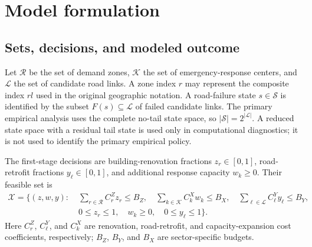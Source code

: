 ﻿%
%

\section{Model formulation}
\label{sec:model}

\subsection{Sets, decisions, and modeled outcome}
\label{sec:notation}

Let \(\mathcal R\) be the set of demand zones, \(\mathcal K\) the set of
emergency-response centers, and \(\mathcal L\) the set of candidate road
links. A zone index \(r\) may represent the composite index \(rl\) used in
the original geographic notation. A road-failure state \(s\in\mathcal S\)
is identified by the subset \(F(s)\subseteq\mathcal L\) of failed candidate
links. The primary empirical analysis uses the complete no-tail state space,
so \(\lvert\mathcal S\rvert=2^{\lvert\mathcal L\rvert}\). A reduced state
space with a residual tail state is used only in computational diagnostics;
it is not used to identify the primary empirical policy.

The first-stage decisions are building-renovation fractions
\(z_r\in[0,1]\), road-retrofit fractions \(y_\ell\in[0,1]\), and additional
response capacity \(w_k\geq0\). Their feasible set is
\begin{align}
\mathcal X
  =\bigg\{(z,w,y):\;&
     \sum_{r\in\mathcal R} C_r^Z z_r \leq B_Z,\quad
     \sum_{k\in\mathcal K} C_k^X w_k \leq B_X,\quad
     \sum_{\ell\in\mathcal L} C_\ell^Y y_\ell \leq B_Y,
     \nonumber\\[-2mm]
   &0\leq z_r\leq1,\quad w_k\geq0,\quad 0\leq y_\ell\leq1
   \bigg\}.
\label{eq:feasible-set}
\end{align}
Here \(C_r^Z\), \(C_\ell^Y\), and \(C_k^X\) are renovation, road-retrofit,
and capacity-expansion cost coefficients, respectively; \(B_Z\), \(B_Y\),
and \(B_X\) are sector-specific budgets.

